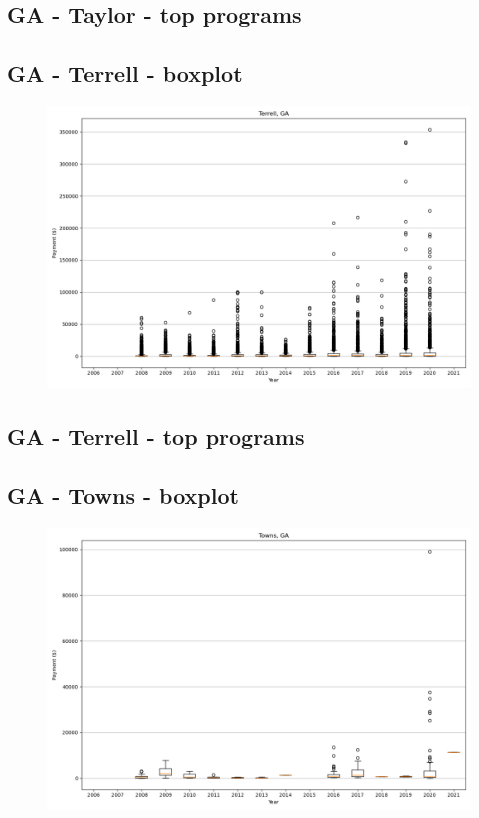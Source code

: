 \subsection*{GA - Taylor - top programs}

\newpage
\subsection*{GA - Terrell - boxplot}
\begin{figure}[h]
\centering
\includegraphics[width=7in]{../output/boxplots/counties/Terrell-GA_boxplot.png}
\end{figure}


\subsection*{GA - Terrell - top programs}

\newpage
\subsection*{GA - Towns - boxplot}
\begin{figure}[h]
\centering
\includegraphics[width=7in]{../output/boxplots/counties/Towns-GA_boxplot.png}
\end{figure}


